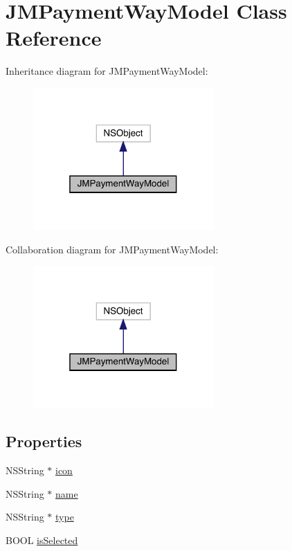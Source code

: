 \hypertarget{interface_j_m_payment_way_model}{}\section{J\+M\+Payment\+Way\+Model Class Reference}
\label{interface_j_m_payment_way_model}


Inheritance diagram for J\+M\+Payment\+Way\+Model\+:\nopagebreak
\begin{figure}[H]
\begin{center}
\leavevmode
\includegraphics[width=196pt]{interface_j_m_payment_way_model__inherit__graph}
\end{center}
\end{figure}


Collaboration diagram for J\+M\+Payment\+Way\+Model\+:\nopagebreak
\begin{figure}[H]
\begin{center}
\leavevmode
\includegraphics[width=196pt]{interface_j_m_payment_way_model__coll__graph}
\end{center}
\end{figure}
\subsection*{Properties}
\begin{DoxyCompactItemize}
\item 
N\+S\+String $\ast$ \mbox{\hyperlink{interface_j_m_payment_way_model_a6721d0526b0f2a8b7da397da0be99e92}{icon}}
\item 
N\+S\+String $\ast$ \mbox{\hyperlink{interface_j_m_payment_way_model_a3a9d9e56c28884c8cfcbed1ba3070c61}{name}}
\item 
N\+S\+String $\ast$ \mbox{\hyperlink{interface_j_m_payment_way_model_a27ef9887b202e1b920580cad597dbf0d}{type}}
\item 
B\+O\+OL \mbox{\hyperlink{interface_j_m_payment_way_model_af15437598e498ced9643cda97c2ed896}{is\+Selected}}
\end{DoxyCompactItemize}


